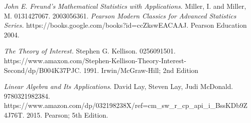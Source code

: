 


\begin{thebibliography}{9}

\textit{John E. Freund's Mathematical Statistics with Applications.}
Miller, I. and Miller, M.
0131427067.
2003056361.
\textit{Pearson Modern Classics for Advanced Statistics Series.}
https://books.google.com/books?id=ccZkswEACAAJ.
Pearson Education 2004.

\vspace{5mm}

\textit{The Theory of Interest.}
Stephen G. Kellison.
0256091501.
https://www.amaxon.com/Stephen-Kellison-Theory-Interest-Second/dp/B004K37PJC.
1991.
Irwin/McGraw-Hill; 2nd Edition

  
\vspace{5mm}

\textit{Linear Algebra and Its Applications}.
David Lay, Steven Lay, Judi McDonald.
9780321982384.
https://www.amazon.com/dp/032198238X/ref=cm\_sw\_r\_cp\_api\_i\_BssKDb9Z4J76T.
2015.
Pearson; 5th Edition.

 

\end{thebibliography}
